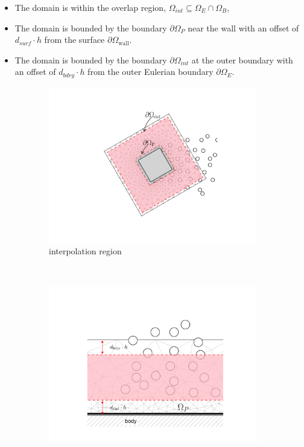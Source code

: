 	\begin{itemize}
	\item The domain is within the overlap region, $\Omega_{int} \subseteq \Omega_E \cap \Omega_B$,
	\item The domain is bounded by the boundary $\partial \Omega_P$ near the wall with an offset of $d_{surf}\cdot h$ from the surface $\partial \Omega_{\mathrm{wall}}$.
	\item The domain is bounded by the boundary $\partial \Omega_{int}$ at the outer boundary with an offset of $d_{bdry}\cdot h$ from the outer Eulerian boundary $\partial \Omega_{E}$.
	\end{itemize}

	\begin{figure}[t]
     \centering
     \begin{subfigure}[t]{0.35\textwidth}
             \includegraphics[trim=4.37cm 1.58cm 3.86cm 1.58cm, clip, width=\linewidth]{./figures/hybrid/interpolation/interpRegion.pdf}
             \caption{interpolation region}
             \label{fig:interpRegion}
     \end{subfigure}%
     ~ %
     \begin{subfigure}[t]{0.6\textwidth}
             \includegraphics[width=\linewidth]{./figures/hybrid/interpolation/hybrid_domains_withInterpReg.pdf}

\end{subfigure}
\end{figure}
